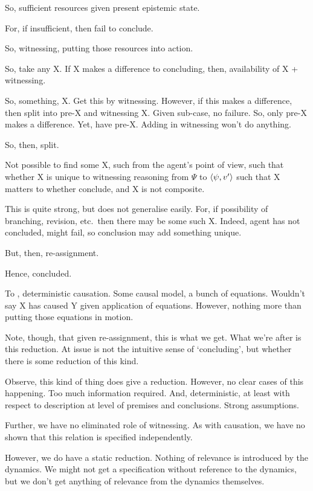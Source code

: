 \begin{note}
  So, sufficient resources given present epistemic state.

  For, if insufficient, then fail to conclude.

  So, witnessing, putting those resources into action.

  So, take any X.
  If X makes a difference to concluding, then, availability of X + witnessing.

  So, something, X.
  Get this by witnessing.
  However, if this makes a difference, then split into pre-X and witnessing X.
  Given sub-case, no failure.
  So, only pre-X makes a difference.
  Yet, have pre-X.
  Adding in witnessing won't do anything.

  So, then, split.

  Not possible to find some X, such from the agent's point of view, such that whether X is unique to witnessing reasoning from \(\Psi\) to \(\langle \psi, v' \rangle\) such that X matters to whether conclude, and X is not composite.

  This is quite strong, but does not generalise easily.
  For, if possibility of branching, revision, etc.\ then there may be some such X.
  Indeed, agent has not concluded, might fail, so conclusion may add something unique.

  But, then, re-assignment.

  Hence, concluded.

  To , deterministic causation.
  Some causal model, a bunch of equations.
  Wouldn't say X has caused Y given application of equations.
  However, nothing more than putting those equations in motion.

  Note, though, that given re-assignment, this is what we get.
  What we're after is this reduction.
  At issue is not the intuitive sense of `concluding', but whether there is some reduction of this kind.

  Observe, this kind of thing does give a reduction.
  However, no clear cases of this happening.
  Too much information required.
  And, deterministic, at least with respect to description at level of premises and conclusions.
  Strong assumptions.

  Further, we have no eliminated role of witnessing.
  As with causation, we have no shown that this relation is specified independently.

  However, we do have a static reduction.
  Nothing of relevance is introduced by the dynamics.
  We might not get a specification without reference to the dynamics, but we don't get anything of relevance from the dynamics themselves.


\end{note}
